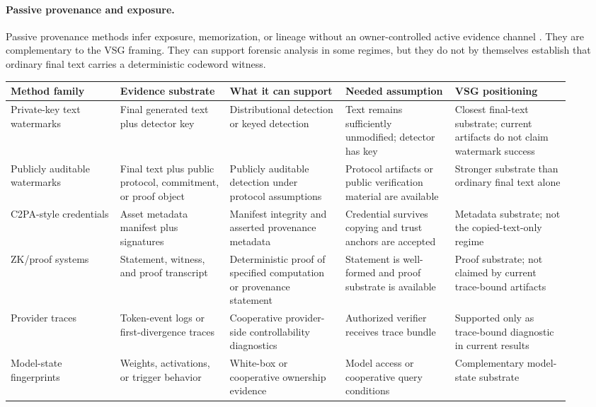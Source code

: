 \paragraph{Passive provenance and exposure.}
Passive provenance methods infer exposure, memorization, or lineage without an
owner-controlled active evidence channel
\cite{carlini2024stealing,liang2024model,xie2024recall,puerto2025scaling,ravichander2025imprint}.
They are complementary to the VSG framing.  They can support forensic analysis
in some regimes, but they do not by themselves establish that ordinary final
text carries a deterministic codeword witness.

\begin{table}[t]
\centering
\scriptsize
\setlength{\tabcolsep}{2pt}
\renewcommand{\arraystretch}{1.08}
\begin{tabular}{p{0.18\linewidth}p{0.18\linewidth}p{0.19\linewidth}p{0.18\linewidth}p{0.19\linewidth}}
\toprule
Method family & Evidence substrate & What it can support & Needed assumption & VSG positioning \\
\midrule
Private-key text watermarks & Final generated text plus detector key & Distributional detection or keyed detection & Text remains sufficiently unmodified; detector has key & Closest final-text substrate; current artifacts do not claim watermark success \\
Publicly auditable watermarks & Final text plus public protocol, commitment, or proof object & Publicly auditable detection under protocol assumptions & Protocol artifacts or public verification material are available & Stronger substrate than ordinary final text alone \\
C2PA-style credentials & Asset metadata manifest plus signatures & Manifest integrity and asserted provenance metadata & Credential survives copying and trust anchors are accepted & Metadata substrate; not the copied-text-only regime \\
ZK/proof systems & Statement, witness, and proof transcript & Deterministic proof of specified computation or provenance statement & Statement is well-formed and proof substrate is available & Proof substrate; not claimed by current trace-bound artifacts \\
Provider traces & Token-event logs or first-divergence traces & Cooperative provider-side controllability diagnostics & Authorized verifier receives trace bundle & Supported only as trace-bound diagnostic in current results \\
Model-state fingerprints & Weights, activations, or trigger behavior & White-box or cooperative ownership evidence & Model access or cooperative query conditions & Complementary model-state substrate \\

\end{tabular}
\end{table}
